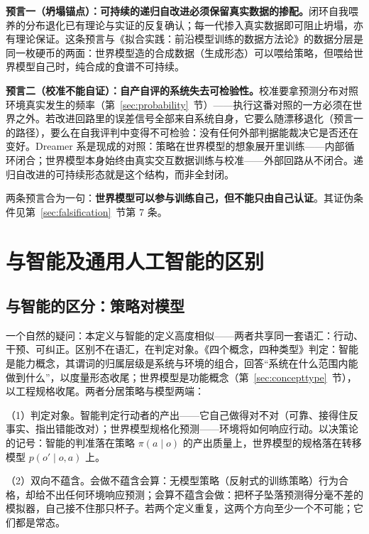 \documentclass[10pt,fontset=fandol]{ctexart}
\begin{document}
\textbf{预言一（坍塌锚点）：可持续的递归自改进必须保留真实数据的掺配。}闭环自我喂养的分布退化已有理论与实证的反复确认\cite{shumailov2024}；每一代掺入真实数据即可阻止坍塌，亦有理论保证\cite{gerstgrasser2024}。这条预言与《拟合实践：前沿模型训练的数据方法论》\cite{yu2026methodology}的数据分层是同一枚硬币的两面：世界模型造的合成数据（生成形态）可以喂给策略，但喂给世界模型自己时，纯合成的食谱不可持续。

\textbf{预言二（校准不能自证）：自产自评的系统失去可检验性。}校准要拿预测分布对照环境真实发生的频率（第~\ref{sec:probability}~节）——执行这番对照的一方必须在世界之外。若改进回路里的误差信号全部来自系统自身，它要么随漂移退化（预言一的路径），要么在自我评判中变得不可检验：没有任何外部判据能裁决它是否还在变好。Dreamer 系是现成的对照：策略在世界模型的想象展开里训练——内部循环闭合；世界模型本身始终由真实交互数据训练与校准——外部回路从不闭合\cite{hafner2025inside}。递归自改进的可持续形态就是这个结构，而非全封闭。

两条预言合为一句：\textbf{世界模型可以参与训练自己，但不能只由自己认证}。其证伪条件见第~\ref{sec:falsification}~节第 7 条。

\section{与智能及通用人工智能的区别}\label{sec:distinction}

\subsection{与智能的区分：策略对模型}\label{sec:policy}

一个自然的疑问：本定义与智能的定义高度相似——两者共享同一套语汇：行动、干预、可纠正。区别不在语汇，在判定对象。《四个概念，四种类型》\cite{yu2026fourconcepts}判定：智能是能力概念，其谓词的归属层级是系统与环境的组合，回答“系统在什么范围内能做到什么”，以度量形态收尾；世界模型是功能概念（第~\ref{sec:concepttype}~节），以工程规格收尾。两者分居策略与模型两端：

（1）判定对象。智能判定行动者的产出——它自己做得对不对（可靠、接得住反事实、指出错能改对）；世界模型规格化预测——环境将如何响应行动。以决策论的记号：智能的判准落在策略 $\pi(a\mid o)$ 的产出质量上，世界模型的规格落在转移模型 $p(o'\mid o,a)$ 上。

（2）双向不蕴含。会做不蕴含会算：无模型策略（反射式的训练策略）行为合格，却给不出任何环境响应预测；会算不蕴含会做：把杯子坠落预测得分毫不差的模拟器，自己接不住那只杯子。若两个定义重复，这两个方向至少一个不可能；它们都是常态。
\end{document}

